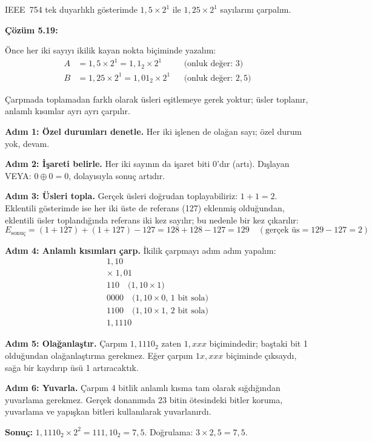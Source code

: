 \FloatBarrier
\begin{ornek}[5.19]
IEEE~754 tek duyarlıklı gösterimde $1{,}5 \times 2^{1}$ ile $1{,}25 \times 2^{1}$ sayılarını çarpalım.

\textbf{Çözüm 5.19:}

Önce her iki sayıyı ikilik kayan nokta biçiminde yazalım:
\begin{align*}
A &= 1{,}5 \times 2^{1} = 1{,}1_2 \times 2^{1} &&\text{(onluk değer: } 3\text{)} \\
B &= 1{,}25 \times 2^{1} = 1{,}01_2 \times 2^{1} &&\text{(onluk değer: } 2{,}5\text{)}
\end{align*}

Çarpmada toplamadan farklı olarak üsleri eşitlemeye gerek yoktur; üsler toplanır, anlamlı kısımlar ayrı ayrı çarpılır.

\textbf{Adım 1: Özel durumları denetle.} Her iki işlenen de olağan sayı; özel durum yok, devam.

\textbf{Adım 2: İşareti belirle.} Her iki sayının da işaret biti 0'dır (artı). Dışlayan VEYA: $0 \oplus 0 = 0$, dolayısıyla sonuç artıdır.

\textbf{Adım 3: Üsleri topla.} Gerçek üsleri doğrudan toplayabiliriz: $1 + 1 = 2$. Eklentili gösterimde ise her iki üste de referans (127) eklenmiş olduğundan, eklentili üsler toplandığında referans iki kez sayılır; bu nedenle bir kez çıkarılır:
\[
E_\text{sonuç} = (1 + 127) + (1 + 127) - 127 = 128 + 128 - 127 = 129 \quad (\text{gerçek üs} = 129 - 127 = 2)
\]

\textbf{Adım 4: Anlamlı kısımları çarp.} İkilik çarpmayı adım adım yapalım:
\[
\begin{array}{r}
  1{,}10 \\
\times\; 1{,}01 \\
\hline
  110 \quad\text{(}1{,}10 \times 1\text{)}\\
 0000 \quad\text{(}1{,}10 \times 0\text{, 1 bit sola)}\\
1100 \quad\text{(}1{,}10 \times 1\text{, 2 bit sola)}\\
\hline
1{,}1110
\end{array}
\]

\textbf{Adım 5: Olağanlaştır.} Çarpım $1{,}1110_2$ zaten $1{,}xxx$ biçimindedir; baştaki bit 1 olduğundan olağanlaştırma gerekmez. Eğer çarpım $1x{,}xxx$ biçiminde çıksaydı, sağa bir kaydırıp üsü 1 artıracaktık.

\textbf{Adım 6: Yuvarla.} Çarpım 4 bitlik anlamlı kısma tam olarak sığdığından yuvarlama gerekmez. Gerçek donanımda 23 bitin ötesindeki bitler koruma, yuvarlama ve yapışkan bitleri kullanılarak yuvarlanırdı.

\textbf{Sonuç:} $1{,}1110_2 \times 2^{2} = 111{,}10_2 = 7{,}5$. Doğrulama: $3 \times 2{,}5 = 7{,}5$. \checkmark
\end{ornek}

